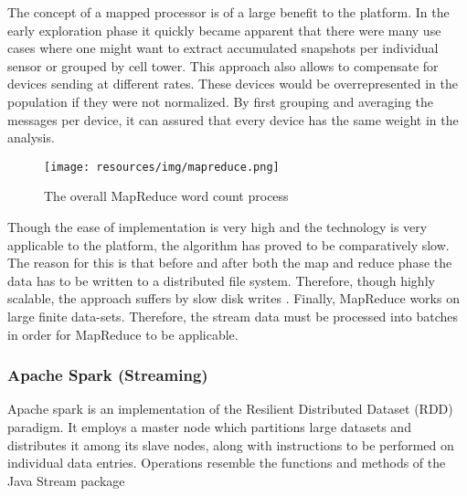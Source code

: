 The concept of a mapped processor is of a large benefit to the platform. In the early exploration phase it quickly became apparent that there were many use cases where one might want to extract accumulated snapshots per individual sensor or grouped by cell tower. This approach also allows to compensate for devices sending at different rates. These devices would be overrepresented in the population if they were not normalized. By first grouping and averaging the messages per device, it can assured that every device has the same weight in the analysis.

\begin{figure}
\centering
\texttt{[image: resources/img/mapreduce.png]}
\caption{The overall MapReduce word count process \cite{mapreduce_img}}
\label{img:mapreduce}
\end{figure}

Though the ease of implementation is very high and the technology is very applicable to the platform, the algorithm has proved to be comparatively slow. The reason for this is that before and after both the map and reduce phase the data has to be written to a distributed file system. Therefore, though highly scalable, the approach suffers by slow disk writes \cite{mapreduce_vs_spark}. Finally, MapReduce works on large finite data-sets. Therefore, the stream data must be processed into batches in order for MapReduce to be applicable.

\subsubsection{Apache Spark (Streaming)}
Apache spark \cite{web:spark} is an implementation of the Resilient Distributed Dataset (RDD) paradigm. It employs a master node which partitions large datasets and distributes it among its slave nodes, along with instructions to be performed on individual data entries. Operations resemble the functions and methods of the Java Stream package \cite{java_stream}

